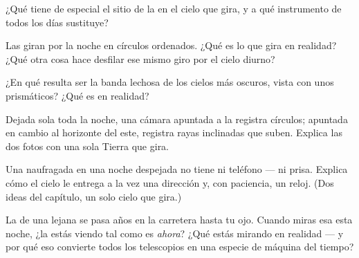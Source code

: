 \begin{exercise}[$\star$]\label{exo:g5:stars-night-sky:6}
¿Qué tiene de especial el sitio de la  en el cielo que
gira, y a qué instrumento de todos los días sustituye?
\end{exercise}

\begin{exercise}[$\star$]\label{exo:g5:stars-night-sky:7}
Las  giran por la noche en círculos ordenados. ¿Qué es lo
que gira en realidad? ¿Qué otra cosa hace desfilar ese mismo giro por
el cielo diurno?
\end{exercise}

\begin{exercise}[$\star$]\label{exo:g5:stars-night-sky:8}
¿En qué resulta ser la banda lechosa de los cielos más oscuros, vista
con unos prismáticos? ¿Qué es en realidad?
\end{exercise}

\begin{exercise}[$\star\star$]\label{exo:g5:stars-night-sky:9}
Dejada sola toda la noche, una cámara apuntada a la
 registra círculos; apuntada en cambio al horizonte
del este, registra rayas inclinadas que suben. Explica las dos fotos
con una sola Tierra que gira.
\end{exercise}

\begin{exercise}[$\star\star$]\label{exo:g5:stars-night-sky:10}
Una naufragada en una noche despejada no tiene  ni teléfono
--- ni prisa. Explica cómo el cielo le entrega a la vez una dirección
y, con paciencia, un reloj. (Dos ideas del capítulo, un solo cielo que
gira.)
\end{exercise}

\begin{exercise}[$\star\star$]\label{exo:g5:stars-night-sky:11}
La  de una  lejana se pasa años en la carretera hasta
tu ojo. Cuando miras esa  esta noche, ¿la estás viendo tal
como es \emph{ahora}? ¿Qué estás mirando en realidad --- y por qué eso
convierte todos los telescopios en una especie de máquina del tiempo?
\end{exercise}
